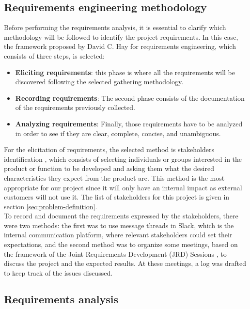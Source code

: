 \documentclass[english, 12pt, a4paper, sci, utf8, a-1b, online]{aaltothesis}
\begin{document}
\subsection{Requirements engineering methodology}
\label{sec:req-methodology}

Before performing the requirements analysis, it is essential to clarify which methodology will be followed to identify the project requirements. In this case, the framework proposed by David C. Hay \cite{hay2003requirements} for requirements engineering, which consists of three steps, is selected:

\begin{itemize}
    \item \textbf{Eliciting requirements}: this phase is where all the requirements will be discovered following the selected gathering methodology.
    \item \textbf{Recording requirements}: The second phase consists of the documentation of the requirements previously collected.
    \item \textbf{Analyzing requirements}: Finally, those requirements have to be analyzed in order to see if they are clear, complete, concise, and unambiguous.
\end{itemize}

For the elicitation of requirements, the selected method is stakeholders identification \cite{mitchell1997toward}, which consists of selecting individuals or groups interested in the product or function to be developed and asking them what the desired characteristics they expect from the product are. This method is the most appropriate for our project since it will only have an internal impact as external customers will not use it. The list of stakeholders for this project is given in section \ref{sec:problem-definition}.\\

To record and document the requirements expressed by the stakeholders, there were two methods: the first was to use message threads in Slack, which is the internal communication platform, where relevant stakeholders could set their expectations, and the second method was to organize some meetings, based on the framework of the Joint Requirements Development (JRD) Sessions \cite{hay2003requirements}, to discuss the project and the expected results. At these meetings, a log was drafted to keep track of the issues discussed.

\subsection{Requirements analysis}
\label{sec:req-analysis}
\end{document}
